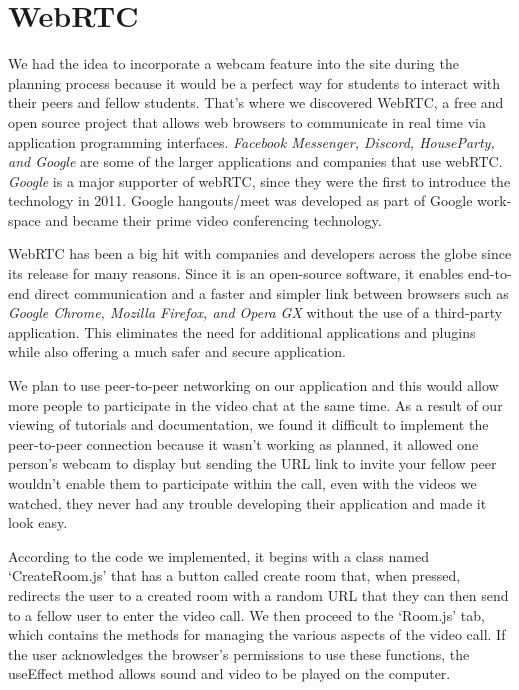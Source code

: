 \section{WebRTC}

We had the idea to incorporate a webcam feature into the site during the planning process because it would be a perfect way for students to interact with their peers and fellow students. That's where we discovered WebRTC, a free and open source project that allows web browsers to communicate in real time via application programming interfaces. \textit{Facebook Messenger, Discord, HouseParty, and Google} are some of the larger applications and companies that use webRTC. \textit{Google} is a major supporter of webRTC, since they were the first to introduce the technology in 2011. Google hangouts/meet was developed as part of Google work-space and became their prime video conferencing technology.\hfill \break

WebRTC has been a big hit with companies and developers across the globe since its release for many reasons. Since it is an open-source software, it enables end-to-end direct communication and a faster and simpler link between browsers such as \textit{Google Chrome, Mozilla Firefox, and Opera GX} without the use of a third-party application. This eliminates the need for additional applications and plugins while also offering a much safer and secure application. \hfill \break

We plan to use peer-to-peer networking on our application and this would allow more people to participate in the video chat at the same time. As a result of our viewing of tutorials and documentation, we found it difficult to implement the peer-to-peer connection because it wasn't working as planned, it allowed one person's webcam to display but sending the URL link to invite your fellow peer wouldn't enable them to participate within the call, even with the videos we watched, they never had any trouble developing their application and made it look easy. \hfill \break

According to the code we implemented, it begins with a class named ‘CreateRoom.js' that has a button called create room that, when pressed, redirects the user to a created room with a random URL that they can then send to a fellow user to enter the video call. We then proceed to the ‘Room.js' tab, which contains the methods for managing the various aspects of the video call. If the user acknowledges the browser's permissions to use these functions, the useEffect method allows sound and video to be played on the computer. \hfill \break

